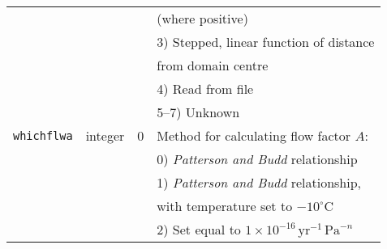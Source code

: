 \documentclass[11pt]{article}
\begin{document}
\begin{center}
\begin{tabular}{|c|c|c|l|}
 & & & (where positive) \\
 & & & 3) Stepped, linear function of distance \\
 & & & from domain centre \\
 & & & 4) Read from file \\
 & & & 5--7) Unknown \\
\hline
\texttt{whichflwa} & integer & 0 & Method for calculating flow factor $A$:\\
 & & & 0) \emph{Patterson and Budd} relationship \\
 & & & 1) \emph{Patterson and Budd} relationship, \\
 & & & with temperature set to $-10^{\circ}\mathrm{C}$ \\
 & & & 2) Set equal to $1\times 10^{-16}\,\mathrm{yr}^{-1}
\,\mathrm{Pa}^{-n}$ \\
\hline
\end{tabular}
\end{center}
%
%
\end{document}
